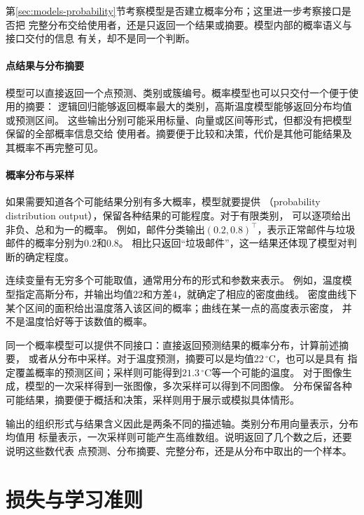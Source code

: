 第\ref{sec:models-probability}节考察模型是否建立概率分布；这里进一步考察接口是否把
完整分布交给使用者，还是只返回一个结果或摘要。模型内部的概率语义与接口交付的信息
有关，却不是同一个判断。

\paragraph{点结果与分布摘要}

模型可以直接返回一个点预测、类别或簇编号。概率模型也可以只交付一个便于使用的摘要：
逻辑回归能够返回概率最大的类别，高斯温度模型能够返回分布均值或预测区间。
这些输出分别可能采用标量、向量或区间等形式，但都没有把模型保留的全部概率信息交给
使用者。摘要便于比较和决策，代价是其他可能结果及其概率不再完整可见。

\paragraph{概率分布与采样}
\label{sec:models-distribution-output}

如果需要知道各个可能结果分别有多大概率，模型就要提供
（probability distribution output），保留各种结果的可能程度。对于有限类别，
可以逐项给出非负、总和为一的概率。
例如，邮件分类输出$(0.2,0.8)^{\top}$，表示正常邮件与垃圾邮件的概率分别为$0.2$和$0.8$。
相比只返回“垃圾邮件”，这一结果还体现了模型对判断的确定程度。

连续变量有无穷多个可能取值，通常用分布的形式和参数来表示。
例如，温度模型指定高斯分布，并输出均值$22$和方差$4$，就确定了相应的密度曲线。
密度曲线下某个区间的面积给出温度落入该区间的概率；曲线在某一点的高度表示密度，
并不是温度恰好等于该数值的概率。

同一个概率模型可以提供不同接口：直接返回预测结果的概率分布，计算前述摘要，
或者从分布中采样。对于温度预测，摘要可以是均值$22\,^{\circ}\mathrm{C}$，也可以是具有
指定覆盖概率的预测区间；采样则可能得到$21.3\,^{\circ}\mathrm{C}$等一个可能的温度。
对于图像生成，模型的一次采样得到一张图像，多次采样可以得到不同图像。
分布保留各种可能结果，摘要便于概括和决策，采样则用于展示或模拟具体情形。

输出的组织形式与结果含义因此是两条不同的描述轴。类别分布用向量表示，分布均值用
标量表示，一次采样则可能产生高维数组。说明返回了几个数之后，还要说明这些数代表
点预测、分布摘要、完整分布，还是从分布中取出的一个样本。

\section{损失与学习准则}
\label{sec:models-objectives}

